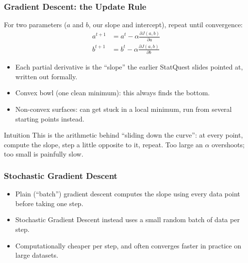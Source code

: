 \begin{frame}[fragile]\frametitle{Gradient Descent: the Update Rule}
For two parameters ($a$ and $b$, our slope and intercept), repeat until convergence:
\begin{align*}
a^{t+1} &= a^t - \alpha \frac{\partial J(a,b)}{\partial a}\\
b^{t+1} &= b^t - \alpha \frac{\partial J(a,b)}{\partial b}
\end{align*}
\begin{itemize}
\item Each partial derivative is the ``slope'' the earlier StatQuest slides pointed at, written out formally.
\item Convex bowl (one clean minimum): this always finds the bottom.
\item Non-convex surfaces: can get stuck in a local minimum, run from several starting points instead.
\end{itemize}

\begin{block}{Intuition}
This is the arithmetic behind ``sliding down the curve'': at every point, compute the slope, step a little opposite to it, repeat. Too large an $\alpha$ overshoots; too small is painfully slow.
\end{block}
\end{frame}

\begin{frame}[fragile]\frametitle{Stochastic Gradient Descent}
\begin{itemize}
\item Plain (``batch'') gradient descent computes the slope using every data point before taking one step.
\item Stochastic Gradient Descent instead uses a small random batch of data per step.
\item Computationally cheaper per step, and often converges faster in practice on large datasets.
\end{itemize}
\end{frame}


